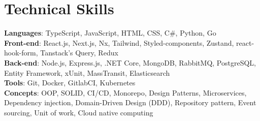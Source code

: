 \section{Technical Skills}
    \begin{itemize}[leftmargin=0.15in, label={}]
	\small{\item{
		\textbf{Languages}{: TypeScript, JavaScript, HTML, CSS, C\#, Python, Go} \\
		\textbf{Front-end}{: React.js, Next.js, Nx, Tailwind, Styled-components, Zustand, react-hook-form, Tanstack's Query, Redux} \\
            \textbf{Back-end}{: Node.js, Express.js, .NET Core, MongoDB, RabbitMQ, PostgreSQL, Entity Framework, xUnit, MassTransit, Elasticsearch} \\
            \textbf{Tools}{: Git, Docker, GitlabCI, Kubernetes} \\
		\textbf{Concepts}{: OOP, SOLID, CI/CD, Monorepo, Design Patterns, Microservices, Dependency injection, Domain-Driven Design (DDD), Repository pattern, Event sourcing, Unit of work, Cloud native computing}
	}}
    \end{itemize}
